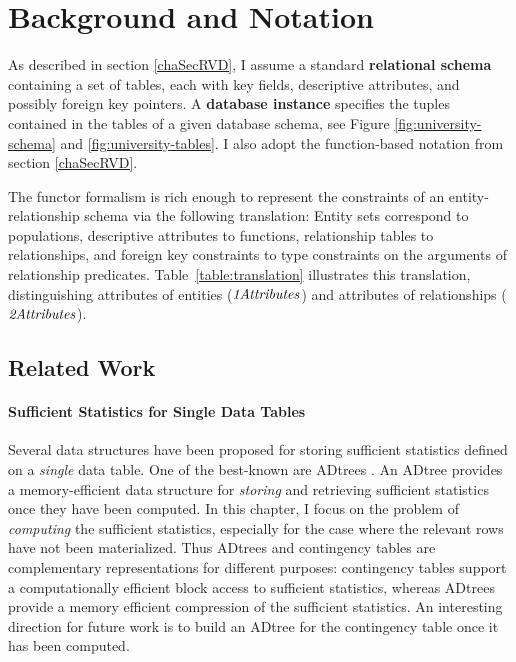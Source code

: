 \documentclass{sfuthesis}
\begin{document}
 
\section{Background and Notation} \label{sec:variables}

As described in section \ref{chaSecRVD}, I  assume a standard \textbf{relational schema} containing a set of tables, each with key fields, descriptive attributes, and possibly foreign key pointers. A \textbf{database instance} specifies the tuples contained in the tables of a given database schema, see Figure \ref{fig:university-schema} and \ref{fig:university-tables}. I  also adopt the function-based notation from section \ref{chaSecRVD}. 

The functor formalism is rich enough to represent the constraints of an entity-relationship schema via the following translation: Entity sets correspond to populations, descriptive attributes to functions, relationship tables to relationships, and foreign key constraints to type constraints on the arguments of relationship predicates. Table~\ref{table:translation}  illustrates this translation, distinguishing attributes of entities ($\it{1Attributes}$) and attributes of relationships ($\it{2Attributes}$). 

\subsection{Related Work} 

\paragraph{Sufficient Statistics for Single Data Tables} Several data structures have been proposed for storing sufficient statistics defined on a {\em single} data table.  One of the best-known are ADtrees \cite{Moore1998}.  An ADtree provides a memory-efficient data structure for {\em storing} and retrieving sufficient statistics once they have been computed. In this chapter, I focus on the problem of {\em computing} the sufficient statistics, especially for the case where the relevant rows have not been materialized. Thus ADtrees and contingency tables are complementary representations for different purposes: contingency tables support a computationally efficient block access to sufficient statistics, whereas ADtrees provide a memory efficient compression of the sufficient statistics.  An interesting direction for future work is to build an ADtree for the contingency table once it has been computed. 
\end{document}
